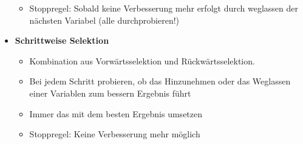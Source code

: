\begin{itemize}
\begin{itemize}
		\item Stoppregel: Sobald keine Verbesserung mehr erfolgt durch weglassen der nächsten Variabel (alle durchprobieren!)
	\end{itemize}
	\item \textbf{Schrittweise Selektion}
	\begin{itemize}
		\item Kombination aus Vorwärtsselektion und Rückwärtsselektion.
		\item Bei jedem Schritt probieren, ob das Hinzunehmen oder das Weglassen einer Variablen zum bessern Ergebnis führt
		\item Immer das mit dem besten Ergebnis umsetzen
		\item Stoppregel: Keine Verbesserung mehr möglich
	\end{itemize}
\end{itemize}

